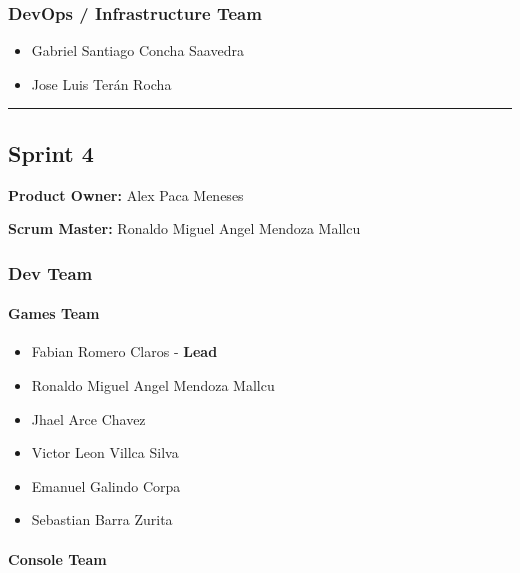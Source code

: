 \documentclass{article}
\providecommand{\tightlist}{
  \setlength{\itemsep}{0pt}\setlength{\parskip}{0pt}}
\begin{document}
\subsubsection{DevOps / Infrastructure Team}\label{devops-team-3}

\begin{itemize}
\tightlist
\item
  Gabriel Santiago Concha Saavedra
\item
  Jose Luis Terán Rocha
\end{itemize}

\begin{center}\rule{0.5\linewidth}{0.5pt}\end{center}

\hypertarget{sprint4}{
\subsection{\texorpdfstring{\textbf{Sprint
4}}{Sprint 4}}\label{sprint4}}

\textbf{Product Owner: }
Alex Paca Meneses

\textbf{Scrum Master: }
Ronaldo Miguel Angel Mendoza Mallcu

\hypertarget{devteam-4}{
\subsubsection{\texorpdfstring{\textbf{Dev
Team}}{Dev Team}}\label{devteam-4}}

\paragraph{Games Team}\label{games-team-4}

\begin{itemize}
\tightlist
\item
  Fabian Romero Claros - \textbf{Lead}
\item
  Ronaldo Miguel Angel Mendoza Mallcu
\item
  Jhael Arce Chavez
\item
  Victor Leon Villca Silva
\item
  Emanuel Galindo Corpa
\item
  Sebastian Barra Zurita
\end{itemize}

\paragraph{Console Team}\label{console-team-4}
\end{document}
